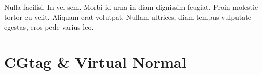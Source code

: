 \begin{savequote}[75mm]
Nulla facilisi. In vel sem. Morbi id urna in diam dignissim feugiat. Proin molestie tortor eu velit. Aliquam erat volutpat. Nullam ultrices, diam tempus vulputate egestas, eros pede varius leo.
\end{savequote}

\chapter{CGtag \& Virtual Normal}
\setcounter{figure}{-1}
\setcounter{table}{-1}
\setcounter{section}{-1}


\cite{ireport}
%

%




